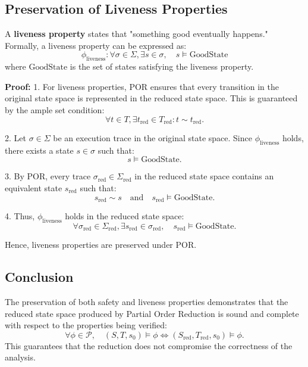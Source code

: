 \subsection{Preservation of Liveness Properties}

A \textbf{liveness property} states that "something good eventually happens." Formally, a liveness property can be expressed as:
\[
\phi_{\text{liveness}}: \forall \sigma \in \Sigma, \exists s \in \sigma, \quad s \models \text{GoodState}
\]
where \( \text{GoodState} \) is the set of states satisfying the liveness property.

\textbf{Proof:}
1. For liveness properties, POR ensures that every transition in the original state space is represented in the reduced state space. This is guaranteed by the ample set condition:
\[
\forall t \in T, \exists t_{\text{red}} \in T_{\text{red}}: t \sim t_{\text{red}}.
\]

2. Let \( \sigma \in \Sigma \) be an execution trace in the original state space. Since \( \phi_{\text{liveness}} \) holds, there exists a state \( s \in \sigma \) such that:
\[
s \models \text{GoodState}.
\]

3. By POR, every trace \( \sigma_{\text{red}} \in \Sigma_{\text{red}} \) in the reduced state space contains an equivalent state \( s_{\text{red}} \) such that:
\[
s_{\text{red}} \sim s \quad \text{and} \quad s_{\text{red}} \models \text{GoodState}.
\]

4. Thus, \( \phi_{\text{liveness}} \) holds in the reduced state space:
\[
\forall \sigma_{\text{red}} \in \Sigma_{\text{red}}, \exists s_{\text{red}} \in \sigma_{\text{red}}, \quad s_{\text{red}} \models \text{GoodState}.
\]

Hence, liveness properties are preserved under POR.

\subsection{Conclusion}
The preservation of both safety and liveness properties demonstrates that the reduced state space produced by Partial Order Reduction is sound and complete with respect to the properties being verified:
\[
\forall \phi \in \mathcal{P}, \quad (S, T, s_0) \models \phi \iff (S_{\text{red}}, T_{\text{red}}, s_0) \models \phi.
\]
This guarantees that the reduction does not compromise the correctness of the analysis.
